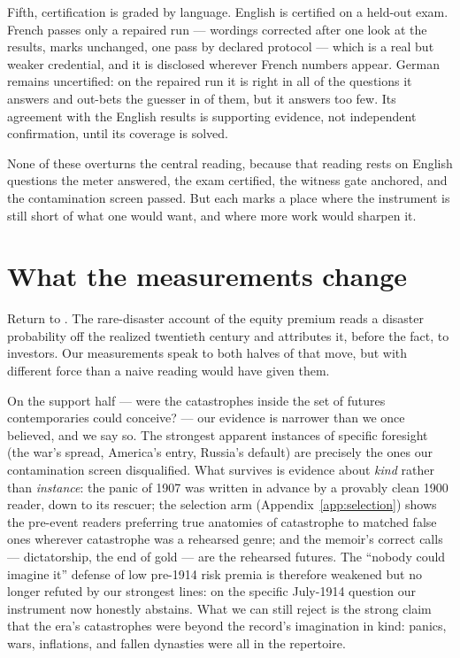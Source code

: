 \documentclass[11pt]{article}
\begin{document}
Fifth, certification is graded by language. English is certified on a held-out exam. French passes only a
repaired run --- wordings corrected after one look at the results, marks unchanged, one pass by declared
protocol --- which is a real but weaker credential, and it is disclosed wherever French numbers appear.
German remains uncertified: on the repaired run it is right in all \NDEexamAnswered{} of the questions it
answers and out-bets the guesser in \NDEexamOutbet{} of them, but it answers too few. Its agreement with
the English results is supporting evidence, not independent confirmation, until its coverage is solved.

None of these overturns the central reading, because that reading rests on English questions the meter
answered, the exam certified, the witness gate anchored, and the contamination screen passed. But each
marks a place where the instrument is still short of what one would want, and where more work would
sharpen it.

\section{What the measurements change}\label{sec:implications}

Return to \citet{barro2006}. The rare-disaster account of the equity premium reads a disaster probability
off the realized twentieth century and attributes it, before the fact, to investors. Our measurements
speak to both halves of that move, but with different force than a naive reading would have given them.

On the support half --- were the catastrophes inside the set of futures contemporaries could conceive? ---
our evidence is narrower than we once believed, and we say so. The strongest apparent instances of
specific foresight (the war's spread, America's entry, Russia's default) are precisely the ones our
contamination screen disqualified. What survives is evidence about \emph{kind} rather than \emph{instance}:
the panic of 1907 was written in advance by a provably clean 1900 reader, down to its rescuer; the
selection arm (Appendix~\ref{app:selection}) shows the pre-event readers preferring true anatomies of
catastrophe to matched false ones wherever catastrophe was a rehearsed genre; and the memoir's correct
calls --- dictatorship, the end of gold --- are the rehearsed futures. The ``nobody could imagine it''
defense of low pre-1914 risk premia is therefore weakened but no longer refuted by our strongest lines:
on the specific July-1914 question our instrument now honestly abstains. What we can still reject is the
strong claim that the era's catastrophes were beyond the record's imagination in kind: panics, wars,
inflations, and fallen dynasties were all in the repertoire.
\end{document}
